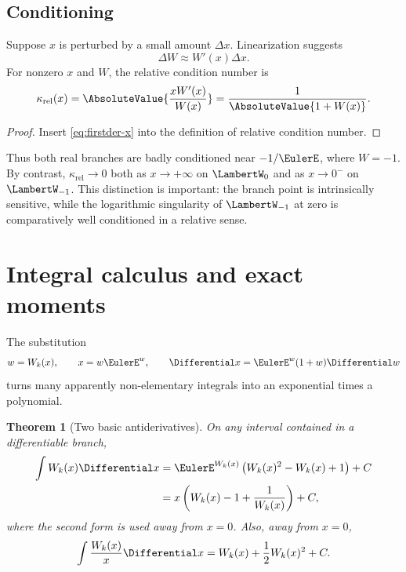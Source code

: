 \documentclass[11pt]{article}
\newtheorem{theorem}{Theorem}[section]
\theoremstyle{remark}
\newcommand{\Wz}{\LambertW_{0}}
\newcommand{\Wm}{\LambertW_{-1}}
\begin{document}
\subsection{Conditioning}

Suppose \(x\) is perturbed by a small amount \(\Delta x\).  Linearization
suggests
\[
       \Delta W\approx W'(x)\Delta x.
\]
For nonzero \(x\) and \(W\), the relative condition number is
\begin{equation}\label{eq:condition}
 \kappa_{\mathrm{rel}}(x)
 =\AbsoluteValue{\frac{xW'(x)}{W(x)}}
 =\frac1{\AbsoluteValue{1+W(x)}}.
\end{equation}

\begin{proof}
Insert \eqref{eq:firstder-x} into the definition of relative condition number.
\end{proof}

Thus both real branches are badly conditioned near \(-1/\EulerE\), where
\(W=-1\).  By contrast, \(\kappa_{\mathrm{rel}}\to0\) both as
\(x\to+\infty\) on \(\Wz\) and as \(x\to0^-\) on \(\Wm\).  This distinction
is important: the branch point is intrinsically sensitive, while the
logarithmic singularity of \(\Wm\) at zero is comparatively well conditioned
in a relative sense.


\section{Integral calculus and exact moments}\label{sec:integrals}

The substitution
\[
       w=W_k(x),\qquad x=w\EulerE^w,\qquad
       \Differential x=\EulerE^w(1+w)\Differential w
\]
turns many apparently non-elementary integrals into an exponential times a
polynomial.

\begin{theorem}[Two basic antiderivatives]\label{thm:antiderivatives}
On any interval contained in a differentiable branch,
\begin{align}
 \int W_k(x)\Differential x
   &=\EulerE^{W_k(x)}
       \left(W_k(x)^2-W_k(x)+1\right)+C\label{eq:intW}\\
   &=x\left(W_k(x)-1+\frac1{W_k(x)}\right)+C,\label{eq:intW-x}
\end{align}
where the second form is used away from \(x=0\).  Also, away from \(x=0\),
\begin{equation}\label{eq:intWoverx}
 \int\frac{W_k(x)}x\Differential x
    =W_k(x)+\frac12W_k(x)^2+C.
\end{equation}
\end{theorem}
\end{document}
